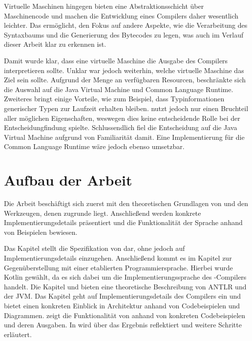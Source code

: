 Virtuelle Maschinen hingegen bieten eine Abstraktionsschicht über Maschinencode und machen die Entwicklung eines Compilers daher wesentlich leichter. Das ermöglicht, den Fokus auf andere Aspekte, wie die Verarbeitung des Syntaxbaums und die Generierung des Bytecodes zu legen, was auch im Verlauf dieser Arbeit klar zu erkennen ist.

Damit wurde klar, dass eine virtuelle Maschine die Ausgabe des Compilers interpretieren sollte. Unklar war jedoch weiterhin, welche virtuelle Maschine das Ziel sein sollte. Aufgrund der Menge an verfügbaren Resourcen, beschränkte sich die Auswahl auf die Java Virtual Machine und Common Language Runtime. Zweiteres bringt einige Vorteile, wie zum Beispiel, dass Typinformationen generischer Typen zur Laufzeit erhalten bleiben. \Toya nutzt jedoch nur einen Bruchteil aller möglichen Eigenschaften, weswegen dies keine entscheidende Rolle bei der Entscheidungfindung spielte. Schlussendlich fiel die Entscheidung auf die Java Virtual Machine aufgrund von Familiarität damit. Eine Implementierung für die Common Language Runtime wäre jedoch ebenso umsetzbar.

\section{Aufbau der Arbeit}

Die Arbeit beschäftigt sich zuerst mit den theoretischen Grundlagen von \toya und den Werkzeugen, denen \toya zugrunde liegt. Anschließend werden konkrete Implementierungsdetails präsentiert und die Funktionalität der Sprache anhand von Beispielen bewiesen.

Das Kapitel  stellt die Spezifikation von \toya dar, ohne jedoch auf Implementierungsdetails einzugehen. Anschließend kommt es im Kapitel  zur Gegenüberstellung mit einer etablierten Programmiersprache. Hierbei wurde Kotlin gewählt, da es sich dabei um die Implementierungssprache des \toya-Compilers handelt. Die Kapitel  und  bieten eine theoretische Beschreibung von ANTLR und der JVM. Das Kapitel  geht auf Implementierungsdetails des Compilers ein und bietet einen konkreten Einblick in Architektur anhand von Codebeispielen und Diagrammen.  zeigt die Funktionalität von \toya anhand von konkreten Codebeispielen und deren Ausgaben. In  wird über das Ergebnis reflektiert und weitere Schritte erläutert.